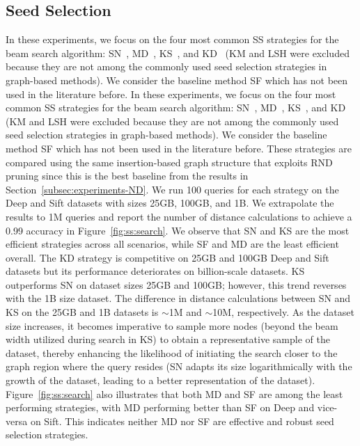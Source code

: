 \subsection{Seed Selection}
In these experiments, we focus on the four most common SS strategies for the beam search algorithm: SN~\cite{hnsw,elpis}, MD~\cite{nsg,vamana}, KS~\cite{kgraph,nsw11,dpg,vamana,nssg}, and KD~\cite{efanna,SPTAG4,hcnng} (KM and LSH were excluded because they are not among the commonly used seed selection strategies in graph-based methods). We consider the baseline method SF which has not been used in the literature before. 
In these experiments, we focus on the four most common SS strategies for the beam search algorithm: SN~\cite{hnsw,elpis}, MD~\cite{nsg,vamana}, KS~\cite{kgraph,nsw11,dpg,vamana,nssg}, and KD~\cite{efanna,SPTAG4,hcnng} (KM and LSH were excluded because they are not among the commonly used seed selection strategies in graph-based methods). We consider the baseline method SF which has not been used in the literature before. 
These strategies are compared using the same insertion-based graph structure that exploits RND pruning since this is the best baseline from the results in Section~\ref{subsec:experiments-ND}.  
We run 100 queries for each strategy on the Deep and Sift datasets with sizes 25GB, 100GB, and 1B. We extrapolate the results to 1M queries and report the number of distance calculations to achieve a 0.99 accuracy in Figure~\ref{fig:ss:search}. We observe that SN and KS are the most efficient strategies across all scenarios, while SF and MD are the least efficient overall. The KD strategy is competitive on 25GB and 100GB Deep and Sift datasets but its performance deteriorates on billion-scale datasets. 
KS outperforms SN on dataset sizes 25GB and 100GB; however, this trend reverses with the 1B size dataset. 
The difference in distance calculations between SN and KS on the 25GB and 1B datasets is $\sim$1M and $\sim$10M, respectively. 
As the dataset size increases, it becomes imperative to sample more nodes (beyond the beam width utilized during search in KS) to obtain a representative sample of the dataset, thereby enhancing the likelihood of initiating the search closer to the graph region where the query resides (SN adapts its size logarithmically with the growth of the dataset, leading to a better representation of the dataset). Figure~\ref{fig:ss:search} also illustrates that both MD and SF are among the least performing strategies, with MD performing better than SF on Deep and vice-versa on Sift. This indicates neither MD nor SF are effective and robust seed selection strategies. 


